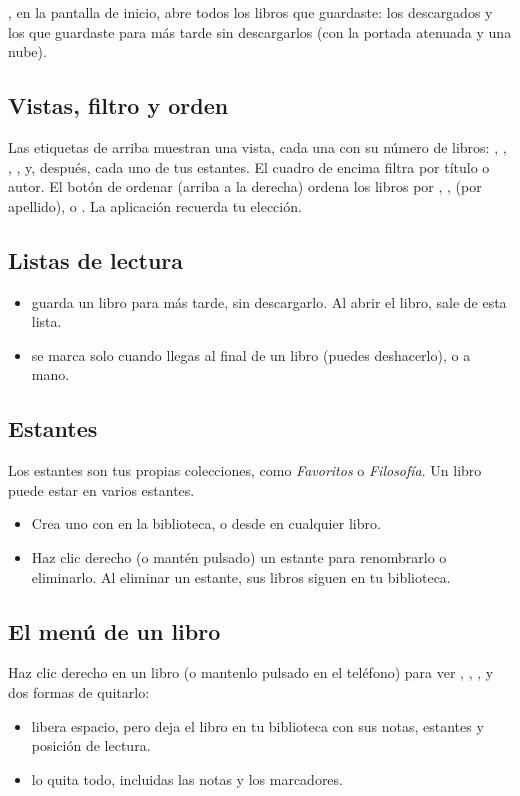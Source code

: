 \documentclass[11pt]{article}
\begin{document}
, en la pantalla de inicio, abre todos los libros que guardaste: los
descargados y los que guardaste para más tarde sin descargarlos (con la portada atenuada y una
nube).


\subsection{Vistas, filtro y orden}
Las etiquetas de arriba muestran una vista, cada una con su número de libros: ,
, , ,  y, después, cada uno de tus
estantes. El cuadro de encima filtra por título o autor. El botón de ordenar (arriba a la derecha)
ordena los libros por , ,  (por apellido),
 o . La aplicación recuerda tu elección.

\subsection{Listas de lectura}
\begin{itemize}
  \item {} guarda un libro para más tarde, sin descargarlo. Al abrir el libro, sale
        de esta lista.
  \item {} se marca solo cuando llegas al final de un libro (puedes deshacerlo), o a
        mano.
\end{itemize}

\subsection{Estantes}
Los estantes son tus propias colecciones, como \emph{Favoritos} o \emph{Filosofía}. Un libro puede
estar en varios estantes.
\begin{itemize}
  \item Crea uno con  en la biblioteca, o desde  en
        cualquier libro.
  \item Haz clic derecho (o mantén pulsado) un estante para renombrarlo o eliminarlo. Al eliminar
        un estante, sus libros siguen en tu biblioteca.
\end{itemize}

\subsection{El menú de un libro}
Haz clic derecho en un libro (o mantenlo pulsado en el teléfono) para ver ,
, ,  y dos formas de quitarlo:
\begin{itemize}
  \item {} libera espacio, pero deja el libro en tu biblioteca con sus notas,
        estantes y posición de lectura.
  \item {} lo quita todo, incluidas las notas y los marcadores.
\end{itemize}
\end{document}
